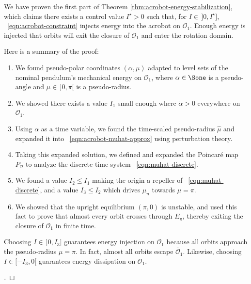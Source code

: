We have proven the first part of Theorem \ref{thm:acrobot-energy-stabilization},
which claims there exists a control value \(I^\star > 0\) such that, for 
\(I \in \, ]0,I^\star]\), ~\eqref{eqn:acrobot-constraint} injects energy into
the acrobot on \(\mathcal{O}_1\).
Enough energy is injected that orbits will exit the closure of \(\mathcal{O}_1\)
and enter the rotation domain.

Here is a summary of the proof:
\begin{enumerate}
    \item We found pseudo-polar coordinates \((\alpha,\mu)\) adapted to level
        sets of the nominal pendulum's mechanical energy on \(\mathcal{O}_1\),
        where \(\alpha \in \Sone\) is a pseudo-angle and \(\mu \in \, ]0,\pi[\)
        is a pseudo-radius.
    \item We showed there exists a value \(I_1\) small enough where 
        \(\dot{\alpha} > 0\) everywhere on \(\mathcal{O}_1\).
    \item Using \(\alpha\) as a time variable, we found the time-scaled
        pseudo-radius \(\hat{\mu}\) and expanded it into
        ~\eqref{eqn:acrobot-muhat-approx} using perturbation theory.
    \item Taking this expanded solution, we defined and expanded the
        Poincar\'{e} map \(P_\mathcal{O}\) to analyze the discrete-time system
        ~\eqref{eqn:muhat-discrete}.
    \item We found a value \(I_2 \leq I_1\) making the origin a repeller of 
        ~\eqref{eqn:muhat-discrete}, and a value \(I_3 \leq I_2\) which drives
        \(\mu_n\) towards \(\mu = \pi\).
    \item We showed that the upright equilibrium \((\pi,0)\) is unstable, and
        used this fact to prove that almost every orbit crosses through
        \(E_\pi\), thereby exiting the closure of \(\mathcal{O}_1\) in finite
        time.
\end{enumerate}
Choosing \(I \in \,]0,I_3]\) guarantees energy injection on
\(\mathcal{O}_1\) because all orbits approach the pseudo-radius \(\mu = \pi\).
In fact, almost all orbits escape \(\bar{\mathcal{O}}_1\).
Likewise, choosing \(I \in [-I_3,0[\) guarantees energy dissipation on
\(\mathcal{O}_1\).

\begin{proof}[\unskip\nopunct]
\end{proof}

